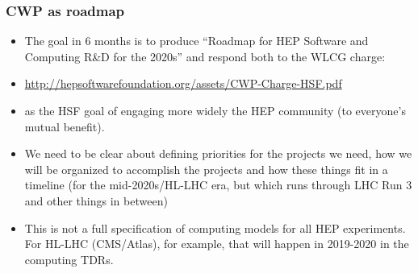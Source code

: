 \begin{frame}
\frametitle{CWP as roadmap}

\begin{itemize}
\item The goal in 6 months is to produce ``Roadmap for HEP Software and 
Computing R\&D for the 2020s'' and respond both to the WLCG charge:
\item \url{http://hepsoftwarefoundation.org/assets/CWP-Charge-HSF.pdf}
\item as the HSF goal of engaging more widely the HEP community (to everyone's mutual benefit).
\item We need to be clear about defining priorities for the projects we need, how we will be organized to accomplish the projects and how these things fit in a timeline (for the mid-2020s/HL-LHC era, but which runs through LHC Run 3 and other things in between)
\item This is not a full specification of computing models for all HEP experiments. For HL-LHC (CMS/Atlas), for example, that will happen in 2019-2020 in the computing TDRs.
\end{itemize}

\end{frame}


